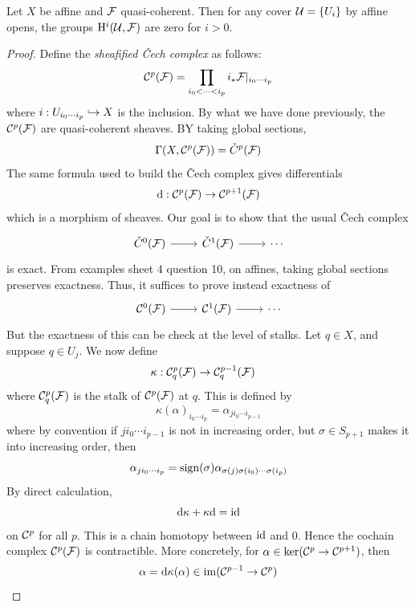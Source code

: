\documentclass{article}
\begin{document}
\begin{theorem}
    \label{thm:sheaf-cohomology-trivial}
    Let \(X\) be affine and \(\mathcal{F}\) quasi-coherent. Then for any cover \(\mathcal{U} = \{U_i\}\) by affine opens, the groups \(\mathrm{H}^i(\mathcal{U}, \mathcal{F})\) are zero for \(i > 0\).
\end{theorem}

\begin{proof}
    Define the \emph{sheafified \v Cech complex} as follows:
    \[\mathcal{C}^p(\mathcal{F}) = \prod_{i_0 < \cdots < i_p}i_*\mathcal{F}\vert_{i_0\cdots i_p}\]
    where \(i : U_{i_0\cdots i_p} \hookrightarrow X\) is the inclusion. By what we have done previously, the \(\mathcal{C}^p(\mathcal{F})\) are quasi-coherent sheaves. BY taking global sections,
    \[\Gamma(X, \mathcal{C}^p(\mathcal{F})) = \check C^p(\mathcal{F})\]
    The same formula used to build the \v Cech complex gives differentials
    \[\dd : \mathcal{C}^p(\mathcal{F}) \to \mathcal{C}^{p+1}(\mathcal{F})\]
    which is a morphism of sheaves. Our goal is to show that the usual \v Cech complex
    \[\begin{tikzcd}
        {\check C^0(\mcF)} & {\check C^1(\mcF)} & \cdots
        \arrow[from=1-1, to=1-2]
        \arrow[from=1-2, to=1-3]
    \end{tikzcd}\]
    is exact. From examples sheet 4 question 10, on affines, taking global sections preserves exactness. Thus, it suffices to prove instead exactness of
    \[\begin{tikzcd}
        {\mcC^0(\mcF)} & {\mcC^1(\mcF)} & \cdots
        \arrow[from=1-1, to=1-2]
        \arrow[from=1-2, to=1-3]
    \end{tikzcd}\]
    But the exactness of this can be check at the level of stalks. Let \(q \in X\), and suppose \(q \in U_j\). We now define
    \begin{align*}
        \kappa : \mathcal{C}^p_q(\mathcal{F}) &\to \mathcal{C}^{p-1}_q(\mathcal{F})
    \end{align*}
    where \(\mathcal{C}^p_q(\mathcal{F})\) is the stalk of \(\mathcal{C}^p(\mathcal{F})\) at \(q\). This is defined by
    \[\kappa(\alpha)_{i_0\cdots i_p} = \alpha_{ji_0\cdots i_{p-1}}\]
    where by convention if \(ji_0\cdots i_{p-1}\) is not in increasing order, but \(\sigma \in S_{p+1}\) makes it into increasing order, then
    \[\alpha_{ji_0\cdots i_p} = \operatorname{sign}(\sigma)\alpha_{\sigma(j)\sigma(i_0)\cdots \sigma(i_p)}\]
    By direct calculation, 
    \[\dd \kappa + \kappa \dd = \operatorname{id}\]
    on \(\mathcal{C}^p\) for all \(p\). This is a chain homotopy between \(\operatorname{id}\) and \(0\). Hence the cochain complex \(\mathcal{C}^p(\mathcal{F})\) is contractible. More concretely, for \(\alpha \in \ker(\mathcal{C}^p \to \mathcal{C}^{p+1})\), then
    \[\alpha = \dd\kappa(\alpha) \in \operatorname{im}(\mathcal{C}^{p-1} \to \mathcal{C}^p)\]
\end{proof}
\end{document}
